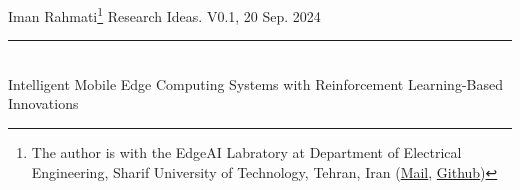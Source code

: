\documentclass[12pt]{article}
\newcommand{\soptitle}{Intelligent Mobile Edge Computing Systems with Reinforcement Learning-Based Innovations}
\newcommand{\yourname}{Iman Rahmati}
\begin{document}
	

	
%


\begin{center} 
	
		\vspace{-17mm}
	
	\large Iman Rahmati\footnote{The author is with the EdgeAI Labratory at Department of Electrical Engineering, Sharif University of Technology, Tehran, Iran (\href{mailto:iman.rahmati@sharif.edu}{Mail}, \href{https://github.com/ImanRHT}{Github})} \hfill Research Ideas. V0.1, 20 Sep. 2024 \vspace{1mm} \hrule
	
	\vspace{-1mm}
	
	
	\noindent\Large 
	\textcolor{white}{i} \\ \LARGE\soptitle \vspace{6mm}\\
\end{center}
	
	




\vspace{-8mm}

\begin{abstract}
	\noindent
	Mobile edge computing often suffers from the dynamic and unknown nature of the environment such as time-varying conditions, heterogeneous devices, and frequent communication requests, imposing significant challenges on improving system performance. To meet the rapidly growing demands of computation-intensive and time-sensitive applications, Reinforcement learning (RL)\cite{mnih2015human} has been proposed as an effective tool to establish low-latency and energy-efficient networks. RL enables network entities to interact with the environment and learn an optimal decision-making policy, usually modeled as a Markov decision process (MDP)\cite{puterman2014markov}.\vspace{2.5mm}
	
	 \noindent\textit{\textbf{Terms—}} Mobile edge computing (MEC), Resource Management, Computation Offloading, Partially Observeble MDP (POMDP), Deep RL (DRL), Multi-Agent DRL (MADRL), Meta-RL, Federated RL
\end{abstract}
\end{document}
